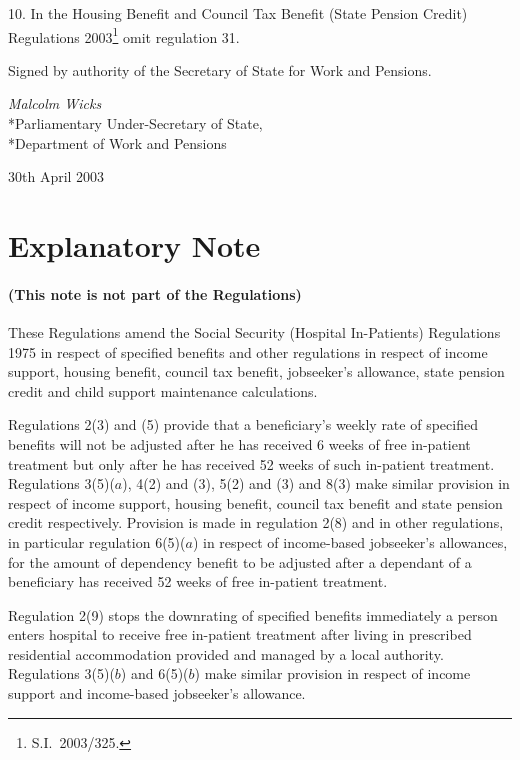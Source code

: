 \documentclass[12pt,a4paper]{article}
\begin{document}
10.  In the Housing Benefit and Council Tax Benefit (State Pension Credit) Regulations 2003\footnote{S.I.\ 2003/325.} omit regulation 31. 

\bigskip

Signed 
by authority of the Secretary of State for Work and Pensions.

{\raggedleft
\emph{Malcolm Wicks}\\*Parliamentary Under-Secretary of State,\\*Department of Work and Pensions

}


30th April 2003

\small

\part{Explanatory Note}

\renewcommand\parthead{— Explanatory Note}

\subsection*{(This note is not part of the Regulations)}

These Regulations amend the Social Security (Hospital In-Patients) Regulations 1975 in respect of specified benefits and other regulations in respect of income support, housing benefit, council tax benefit, jobseeker’s allowance, state pension credit and child support maintenance calculations.

Regulations 2(3) and (5) provide that a beneficiary’s weekly rate of specified benefits will not be adjusted after he has received 6 weeks of free in-patient treatment but only after he has received 52 weeks of such in-patient treatment. Regulations 3(5)($a$), 4(2) and (3), 5(2) and (3) and 8(3) make similar provision in respect of income support, housing benefit, council tax benefit and state pension credit respectively. Provision is made in regulation 2(8) and in other regulations, in particular regulation 6(5)($a$)  in respect of income-based jobseeker’s allowances, for the amount of dependency benefit to be adjusted after a dependant of a beneficiary has received 52 weeks of free in-patient treatment.

Regulation 2(9) stops the downrating of specified benefits immediately a person enters hospital to receive free in-patient treatment after living in prescribed residential accommodation provided and managed by a local authority. Regulations 3(5)($b$)  and 6(5)($b$)  make similar provision in respect of income support and income-based jobseeker’s allowance.
\end{document}
